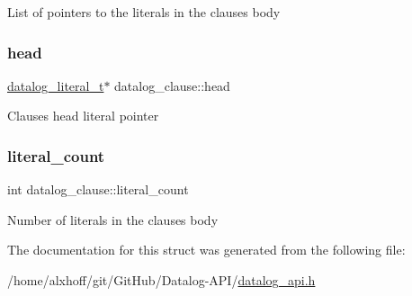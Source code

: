 List of pointers to the literals in the clause\textquotesingle{}s body \mbox{\label{structdatalog__clause_a76efe58a26d93f778904a8ab8f7e12d6}} 
\subsubsection{\texorpdfstring{head}{head}}
{\footnotesize\ttfamily \hyperlink{datalog__api_8h_aeb86f46db4f8142eeb397d20f69f6487}{datalog\+\_\+literal\+\_\+t}$\ast$ datalog\+\_\+clause\+::head}

Clause\textquotesingle{}s head literal pointer \mbox{\label{structdatalog__clause_abcd26a3624b9be0f775ca0828bb2deb9}} 
\subsubsection{\texorpdfstring{literal\+\_\+count}{literal\_count}}
{\footnotesize\ttfamily int datalog\+\_\+clause\+::literal\+\_\+count}

Number of literals in the clause\textquotesingle{}s body 

The documentation for this struct was generated from the following file\+:\begin{DoxyCompactItemize}
\item 
/home/alxhoff/git/\+Git\+Hub/\+Datalog-\/\+A\+P\+I/\hyperlink{datalog__api_8h}{datalog\+\_\+api.\+h}\end{DoxyCompactItemize}

